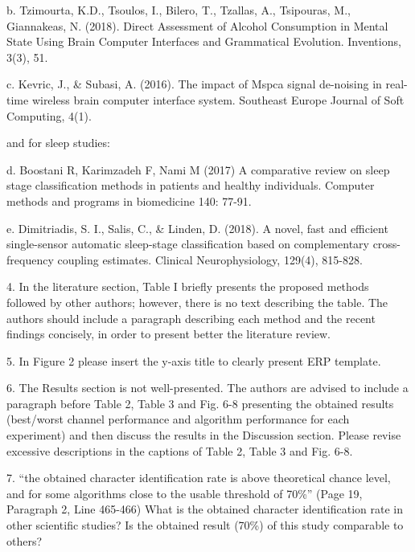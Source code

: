 \documentclass[journal,onecolumn,12pt]{IEEEtran}
\begin{document}
b. Tzimourta, K.D., Tsoulos, I., Bilero, T., Tzallas, A., Tsipouras, M., Giannakeas, N. (2018). Direct Assessment of Alcohol Consumption in Mental State Using Brain Computer Interfaces and Grammatical Evolution. Inventions, 3(3), 51.

 

c. Kevric, J., \& Subasi, A. (2016). The impact of Mspca signal de-noising in real-time wireless brain computer interface system. Southeast Europe Journal of Soft Computing, 4(1).

 

and for sleep studies: 

 

d. Boostani R, Karimzadeh F, Nami M (2017) A comparative review on sleep stage classification methods in patients and healthy individuals. Computer methods and programs in biomedicine 140: 77-91.

 

e. Dimitriadis, S. I., Salis, C., \& Linden, D. (2018). A novel, fast and efficient single-sensor automatic sleep-stage classification based on complementary cross-frequency coupling estimates. Clinical Neurophysiology, 129(4), 815-828.

 

4. In the literature section, Table I briefly presents the proposed methods followed by other authors; however, there is no text describing the table. The authors should include a paragraph describing each method and the recent findings concisely, in order to present better the literature review. 

 

5. In Figure 2 please insert the y-axis title to clearly present ERP template.

 

6. The Results section is not well-presented. The authors are advised to include a paragraph before Table 2, Table 3 and Fig. 6-8 presenting the obtained results (best/worst channel performance and algorithm performance for each experiment) and then discuss the results in the Discussion section. Please revise excessive descriptions in the captions of Table 2, Table 3 and Fig. 6-8.

 

7. “the obtained character identification rate is above theoretical chance level, and for some algorithms close to the usable threshold of 70\%” (Page 19, Paragraph 2, Line 465-466) What is the obtained character identification rate in other scientific studies? Is the obtained result (70\%) of this study comparable to others?
\end{document}
